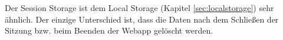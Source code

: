 \label{sec:sessionstorage}

Der Session Storage ist dem Local Storage (Kapitel \ref{sec:localstorage}) sehr ähnlich. 
Der einzige Unterschied ist, dass die Daten nach dem Schließen der Sitzung bzw. beim Beenden der Webapp gelöscht werden. \cite{MDNSessionStorage}

